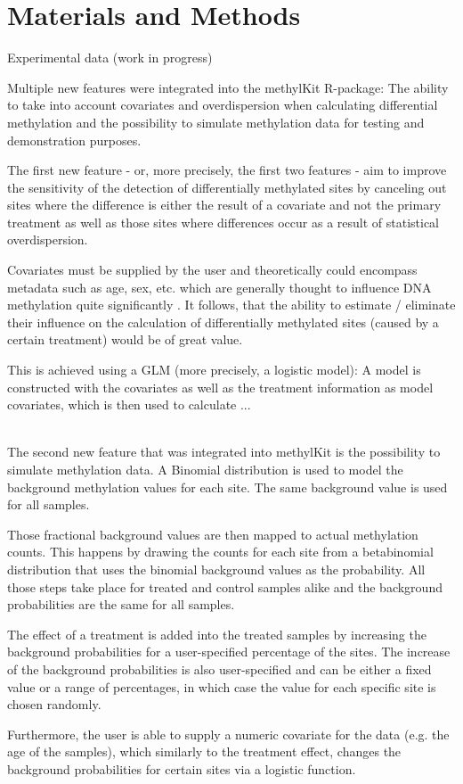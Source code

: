 \section{Materials and Methods}

Experimental data (work in progress)

Multiple new features were integrated into the methylKit R-package: The ability to take into account covariates and overdispersion when calculating differential methylation and the possibility to simulate methylation data for testing and demonstration purposes.

The first new feature - or, more precisely, the first two features - aim to  improve the sensitivity of the detection of differentially methylated sites by canceling out sites where the difference is either the result of a covariate and not the primary treatment as well as those sites where differences occur as a result of statistical overdispersion.

Covariates must be supplied by the user and theoretically could encompass metadata such as age, sex, etc. which are generally thought to influence DNA methylation quite significantly \cite{24561809}. It follows, that the ability to estimate / eliminate their influence on the calculation of differentially methylated sites (caused by a certain treatment) would be of great value.

This is achieved using a GLM (more precisely, a logistic model): A model is constructed with the covariates as well as the treatment information as model covariates, which is then used to calculate ...

\\
The second new feature that was integrated into methylKit is the possibility to simulate methylation data.
A Binomial distribution is used to model the background methylation values for each site. The same background value is used for all samples.

Those fractional background values are then mapped to actual methylation counts. This happens by drawing the counts for each site from a betabinomial distribution that uses the binomial background values as the probability.
All those steps take place for treated and control samples alike and the background probabilities are the same for all samples.

The effect of a treatment is added into the treated samples by increasing the background probabilities for a user-specified percentage of the sites. The increase of the background probabilities is also user-specified and can be either a fixed value or a range of percentages, in which case the value for each specific site is chosen randomly.

Furthermore, the user is able to supply a numeric covariate for the data (e.g. the age of the samples), which similarly to the treatment effect, changes the background probabilities for certain sites via a logistic function.
  